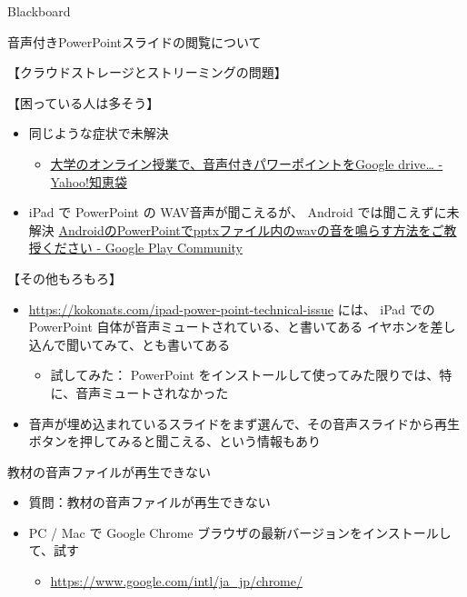 \documentclass[a4j,10pt]{jsarticle}
\begin{document}
{\begin{frame}[label={sec:orgc119bb0},fragile]{Blackboard}
\begin{block}{音声付きPowerPointスライドの閲覧について}
\begin{block}{【クラウドストレージとストリーミングの問題】}
\begin{itemize}
\end{itemize}
\end{block}
\par
\begin{block}{【困っている人は多そう】}
\begin{itemize}
\item 同じような症状で未解決
\begin{itemize}
\item \href{https://detail.chiebukuro.yahoo.co.jp/qa/question\_detail/q12224034462}{大学のオンライン授業で、音声付きパワーポイントをGoogle drive\ldots{} - Yahoo!知恵袋}
\end{itemize}
\item iPad で PowerPoint の WAV音声が聞こえるが、 Android では聞こえずに未解決
\href{https://support.google.com/googleplay/thread/24892579?hl=ja}{AndroidのPowerPointでpptxファイル内のwavの音を鳴らす方法をご教授ください - Google Play Community}
\end{itemize}
\end{block}
\par
\begin{block}{【その他もろもろ】}
\begin{itemize}
\item \url{https://kokonats.com/ipad-power-point-technical-issue} には、 iPad での PowerPoint 自体が音声ミュートされている、と書いてある
イヤホンを差し込んで聞いてみて、とも書いてある
\begin{itemize}
\item 試してみた：  PowerPoint をインストールして使ってみた限りでは、特に、音声ミュートされなかった
\end{itemize}
\item 音声が埋め込まれているスライドをまず選んで、その音声スライドから再生ボタンを押してみると聞こえる、という情報もあり
\end{itemize}
\end{block}
\end{block}
\par
\begin{block}{教材の音声ファイルが再生できない}
\begin{itemize}
\item 質問：教材の音声ファイルが再生できない
\par
\item PC / Mac で Google Chrome ブラウザの最新バージョンをインストールして、試す
\begin{itemize}
\item \url{https://www.google.com/intl/ja\_jp/chrome/}

\end{itemize}
\end{itemize}
\end{block}
\end{frame}}
\end{document}
